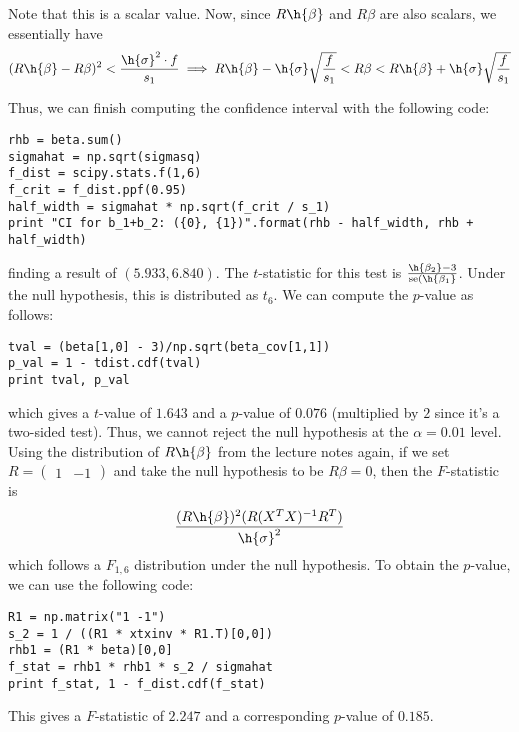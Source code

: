 \documentclass{article}
\newcommand{\openm}{\begin{pmatrix}}
\newcommand{\closem}{\end{pmatrix}}
\begin{document}
Note that this is a scalar value. Now, since $R\h{\beta}$ and $R\beta$ are also scalars, we essentially have
\[
    (R\h{\beta}-R\beta)^2<\frac{\h{\sigma}^2\cdot f}{s_1}\\
    \implies R\h{\beta}-\h{\sigma}\sqrt{\frac{f}{s_1}}<R\beta<R\h{\beta}+\h{\sigma}\sqrt{\frac{f}{s_1}}
\]

Thus, we can finish computing the confidence interval with the following code:
\begin{verbatim}
rhb = beta.sum()
sigmahat = np.sqrt(sigmasq)
f_dist = scipy.stats.f(1,6)
f_crit = f_dist.ppf(0.95)
half_width = sigmahat * np.sqrt(f_crit / s_1)
print "CI for b_1+b_2: ({0}, {1})".format(rhb - half_width, rhb + half_width)
\end{verbatim}
finding a result of $(5.933,6.840)$.
The $t$-statistic for this test is $\frac{\h{\beta_2}-3}{\text{se}(\h{\beta_1}}$. Under the null hypothesis, this is distributed as $t_6$. We can compute the $p$-value as follows:
\begin{verbatim}
tval = (beta[1,0] - 3)/np.sqrt(beta_cov[1,1])
p_val = 1 - tdist.cdf(tval)
print tval, p_val
\end{verbatim}
which gives a $t$-value of $1.643$ and a $p$-value of $0.076$ (multiplied by $2$ since it's a two-sided test). Thus, we cannot reject the null hypothesis at the $\alpha=0.01$ level.
Using the distribution of $R\h{\beta}$ from the lecture notes again, if we set $R=\openm1&-1\closem$ and take the null hypothesis to be $R\beta=0$, then the $F$-statistic is
\[\frac{(R\h{\beta})^2(R(X^TX)^{-1}R^T)}{\h{\sigma}^2}\]
which follows a $F_{1,6}$ distribution under the null hypothesis. To obtain the $p$-value, we can use the following code:
\begin{verbatim}
R1 = np.matrix("1 -1")
s_2 = 1 / ((R1 * xtxinv * R1.T)[0,0])
rhb1 = (R1 * beta)[0,0]
f_stat = rhb1 * rhb1 * s_2 / sigmahat
print f_stat, 1 - f_dist.cdf(f_stat)
\end{verbatim}
This gives a $F$-statistic of $2.247$ and a corresponding $p$-value of $0.185$.
\end{document}
